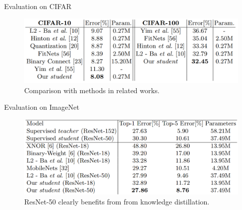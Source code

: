 \documentclass{beamer}
\begin{document}
\begin{frame}{Evaluation on CIFAR}

\begin{figure}[h]
\includegraphics[width=\textwidth]{img/cifar_compare}
\caption{Comparison with methods in related works.}
\end{figure}

\end{frame}

\begin{frame}{Evaluation on ImageNet}

\begin{figure}[h]
\includegraphics[width=\textwidth]{img/imagenet_compare}
\caption{ResNet-50 clearly benefits from from knowledge distillation.}
\end{figure}

\end{frame}
\end{document}
